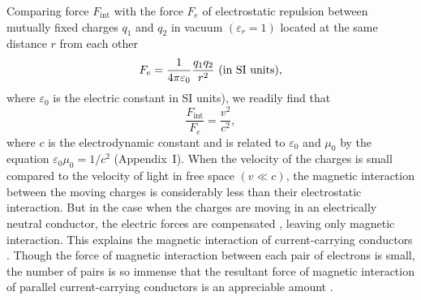 Comparing force $F_{\text{int}}$ with the force $F_{e}$ of electrostatic repulsion between mutually fixed charges $q_{1}$ and $q_{2}$ in vacuum $(\varepsilon_{r} = 1)$ located at the same distance $r$ from each other 
\begin{equation*}%
F_{e} = \ofpe \frac{q_{1}q_{2}}{r^{2}}\,\, \text{(in SI units)},
\end{equation*}
where $\varepsilon_{0}$ is the electric constant in SI units), we readily find that
\begin{equation*}%
\frac{F_{\text{int}}}{F_{e}} =\frac{v^{2}}{c^{2}},
\end{equation*}
where $c$ is the electrodynamic constant  and is related to $\varepsilon_{0}$ and $\mu_{0}$ by the equation $\varepsilon_{0}\mu_{0}= 1/c^{2}$ (Appendix~I). When the velocity of the charges is small compared to the velocity of light in free space $(v \ll c)$, the magnetic interaction between the moving charges is considerably less than their electrostatic interaction. But in the case when the charges are moving in an electrically neutral conductor, the electric forces are compensated , leaving only magnetic interaction. This explains the magnetic interaction of current-carrying conductors . Though the force of magnetic interaction between each pair of electrons is small, the number of pairs is so immense that the resultant force of magnetic interaction of parallel current-carrying conductors is an appreciable amount .

